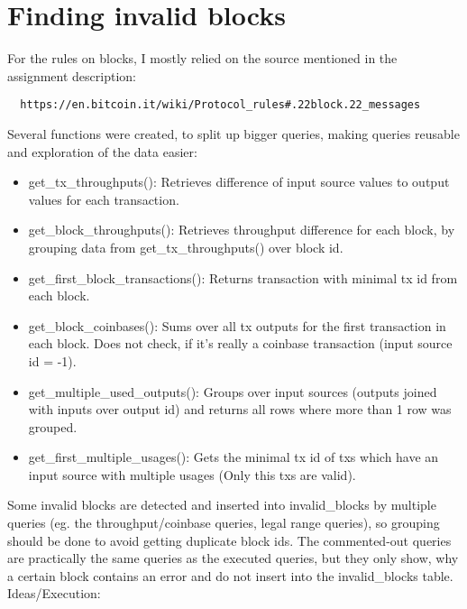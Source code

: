 \documentclass[12pt,a4paper]{article}
\begin{document}
\section{Finding invalid blocks}
For the rules on blocks, I mostly relied on the source mentioned in the assignment description:
\begin{verbatim}
  https://en.bitcoin.it/wiki/Protocol_rules#.22block.22_messages
\end{verbatim}
Several functions were created, to split up bigger queries, making queries reusable and exploration of the data easier:
\begin{itemize}
   \item get\_tx\_throughputs(): Retrieves difference of input source values to output values for each transaction.
   \item get\_block\_throughputs(): Retrieves throughput difference for each block, by grouping data from get\_tx\_throughputs() over block id.
   \item get\_first\_block\_transactions(): Returns transaction with minimal tx id from each block.
   \item get\_block\_coinbases(): Sums over all tx outputs for the first transaction in each block. Does not check, if it's really a coinbase transaction (input source id = -1).
   \item get\_multiple\_used\_outputs(): Groups over input sources (outputs joined with inputs over output id) and returns all rows where more than 1 row was grouped.
   \item get\_first\_multiple\_usages(): Gets the minimal tx id of txs which have an input source with multiple usages (Only this txs are valid).
\end{itemize}
\newline\newline
Some invalid blocks are detected and inserted into invalid\_blocks by multiple queries (eg. the throughput/coinbase queries, legal range queries), so grouping should be done
to avoid getting duplicate block ids.
\newline\newline
The commented-out queries are practically the same queries as the executed queries, but they only show, why a certain block contains an error and do not insert into the invalid\_blocks table.
\newline\newline
Ideas/Execution:
\end{document}
